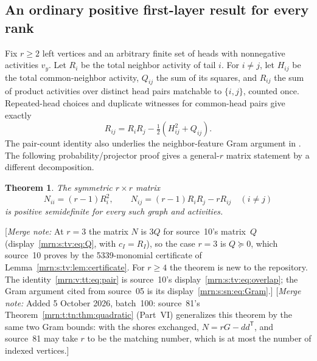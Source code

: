 \documentclass[11pt,a4paper]{article}
\newtheorem{theorem}{Theorem}[section]
\theoremstyle{remark}\newtheorem{remark}[theorem]{Remark}
\newcommand{\mnote}[1]{[\textit{Merge note:} #1]}
\begin{document}
\subsection{An ordinary positive first-layer result for every rank}
Fix $r\ge2$ left vertices and an arbitrary finite set of heads with nonnegative activities $v_y$. Let $R_i$ be the total neighbor activity of tail $i$. For $i\ne j$, let $H_{ij}$ be the total common-neighbor activity, $Q_{ij}$ the sum of its squares, and $R_{ij}$ the sum of product activities over distinct head pairs matchable to $\{i,j\}$, counted once. Repeated-head choices and duplicate witnesses for common-head pairs give exactly
\begin{equation}\label{mrn:v:tt:eq:pair}
 R_{ij}=R_iR_j-\tfrac12(H_{ij}^2+Q_{ij}).
\end{equation}
The pair-count identity also underlies the neighbor-feature Gram argument in \cite[Section 2]{b:m05}. The following probability/projector proof gives a general-$r$ matrix statement by a different decomposition.
\begin{theorem}\label{mrn:v:tt:thm:PSD}
The symmetric $r\times r$ matrix
\begin{equation}\label{mrn:v:tt:eq:N}
 N_{ii}=(r-1)R_i^2,\qquad
 N_{ij}=(r-1)R_iR_j-rR_{ij}\quad(i\ne j)
\end{equation}
is positive semidefinite for every such graph and activities.
\end{theorem}
\mnote{At $r=3$ the matrix $N$ is $3Q$ for source~10's matrix~$Q$
(display~\eqref{mrn:s:tv:eq:Q}, with $c_I=R_I$), so the case $r=3$ is
$Q\succeq0$, which source~10 proves by the 5339-monomial certificate of
Lemma~\ref{mrn:s:tv:lem:certificate}. For $r\ge4$ the theorem is new to the
repository. The identity~\eqref{mrn:v:tt:eq:pair} is source~10's
display~\eqref{mrn:s:tv:eq:overlap}; the Gram argument cited from source~05 is
its display~\eqref{mrn:s:sn:eq:Gram}.}
\mnote{Added 5 October 2026, batch~100: source~81's Theorem~\ref{mrn:t:tn:thm:quadratic}
(Part~VI) generalizes this theorem by the same two Gram bounds: with the
shores exchanged, $N=rG-dd^{\mathsf T}$, and source~81 may take $r$ to be
the matching number, which is at most the number of indexed vertices.}
\end{document}
